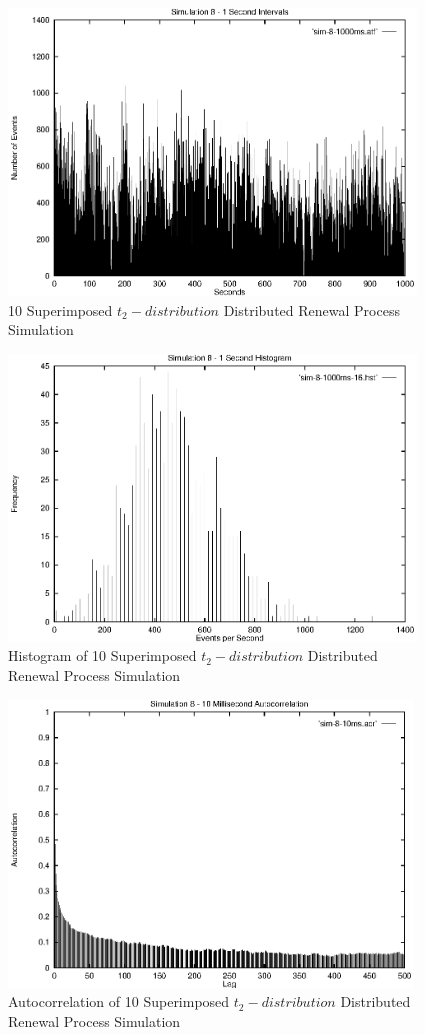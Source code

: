 \begin{figure}
\includegraphics[height=3in]{pics/sim-8-1s-freq.eps}
\caption{10 Superimposed $t_2-distribution$ Distributed Renewal Process Simulation}
\label{simulation:sim8.1s.freq}
\end{figure}


\begin{figure}
\includegraphics[height=3in]{pics/sim-8-1s-hist-16.eps}
\caption{Histogram of 10 Superimposed $t_2-distribution$ Distributed Renewal Process Simulation}
\label{simulation:sim8.1s.hist}
\end{figure}

\begin{figure}
\includegraphics[height=3in]{pics/sim-8-10ms-acr.eps}
\caption{Autocorrelation of 10 Superimposed $t_2-distribution$ Distributed Renewal Process Simulation}
\label{simulation:sim8.10ms.acr}
\end{figure}

